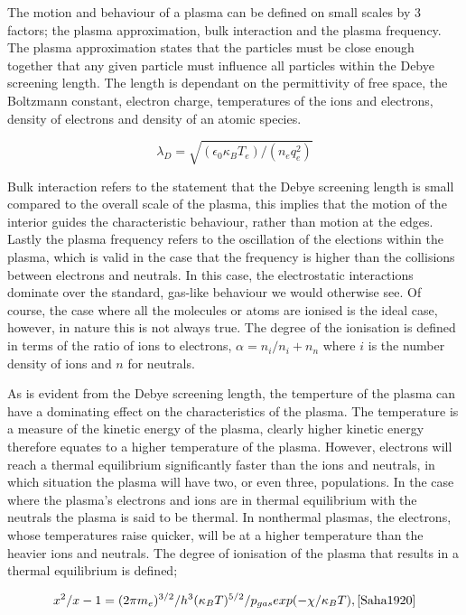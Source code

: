 The motion and behaviour of a plasma can be defined on small scales by 3 factors; the plasma approximation, bulk interaction and the plasma frequency.
The plasma approximation states that the particles must be close enough together that any given particle must influence all particles within the Debye screening length.
The length is dependant on the permittivity of free space, the Boltzmann constant, electron charge, temperatures of the ions and electrons, density of electrons and density of an atomic species.

\begin{equation}
	\lambda_D = \sqrt{(\epsilon_0\kappa_BT_e)/(n_eq_e^2)}
\end{equation}

Bulk interaction refers to the statement that the Debye screening length is small compared to the overall scale of the plasma, this implies that the motion of the interior guides the characteristic behaviour, rather than motion at the edges.
Lastly the plasma frequency refers to the oscillation of the elections within the plasma, which is valid in the case that the frequency is higher than the collisions between electrons and neutrals.
In this case, the electrostatic interactions dominate over the standard, gas-like behaviour we would otherwise see.
Of course, the case where all the molecules or atoms are ionised is the ideal case, however, in nature this is not always true.
The degree of the ionisation is defined in terms of the ratio of ions to electrons, $\alpha = n_i/{n_i + n_n}$ where $i$ is the number density of ions and $n$ for neutrals.

As is evident from the Debye screening length, the temperture of the plasma can have a dominating effect on the characteristics of the plasma.
The temperature is a measure of the kinetic energy of the plasma, clearly higher kinetic energy therefore equates to a higher temperature of the plasma.
However, electrons will reach a thermal equilibrium significantly faster than the ions and neutrals, in which situation the plasma will have two, or even three, populations.
In the case where the plasma's electrons and ions are in thermal equilibrium with the neutrals the plasma is said to be thermal.
In nonthermal plasmas, the electrons, whose temperatures raise quicker, will be at a higher temperature than the heavier ions and neutrals.
The degree of ionisation of the plasma that results in a thermal equilibrium is defined;

\begin{equation}
	x^2/{x - 1} = (2\pi m_e)^{3/2}/h^3 (\kappa_BT)^{5/2}/p_{gas} exp(-{\chi/\kappa_BT}), \cite{Saha1920}
\end{equation}

